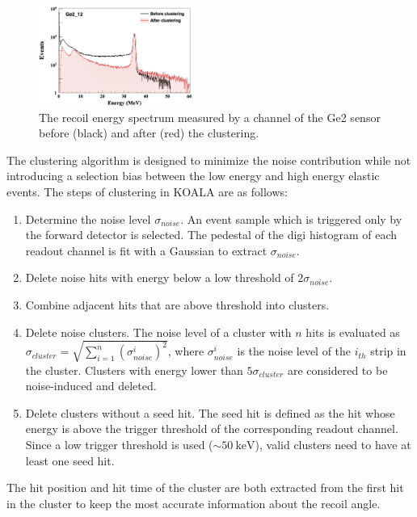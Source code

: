 \documentclass[number,5p]{elsarticle}
\begin{document}
\begin{figure}[b!]
  \centering
  \includegraphics[width=0.45\textwidth]{./clustering.png}
  \caption{The recoil energy spectrum measured by a channel of the Ge2 sensor before (black) and after (red) the clustering.}
  \label{fig:clustering}
\end{figure}
The clustering algorithm is designed to minimize the noise contribution while
not introducing a selection bias between the low energy and high energy elastic events.
The steps of clustering in KOALA are as follows:
\begin{enumerate}
\item Determine the noise level $\sigma_{noise}$. An event sample which is
  triggered only by the forward detector is selected. The pedestal of the digi
  histogram of each readout channel is fit with a Gaussian to extract $\sigma_{noise}$.
\item Delete noise hits with energy below a low threshold of $2\sigma_{noise}$.
\item Combine adjacent hits that are above threshold into clusters.
\item Delete noise clusters. The noise level of a cluster with $n$ hits is evaluated as
  $\sigma_{cluster} = \sqrt{\sum_{i=1}^n{(\sigma_{noise}^i)^2}}$, where $\sigma_{noise}^i$ is
  the noise level of the $i_{th}$ strip in the cluster. Clusters with energy lower than $5\sigma_{cluster}$ are considered to be noise-induced and deleted.
\item Delete clusters without a seed hit. The seed hit is defined as the
  hit whose energy is above the trigger threshold of the corresponding readout
  channel. Since a low trigger threshold is used ($\sim\SI{50}{\keV}$), valid clusters need to have at least one seed hit.
\end{enumerate}
The hit position and hit time of the cluster are both extracted from the first
hit in the cluster to keep the most accurate information about the recoil angle.
\end{document}
